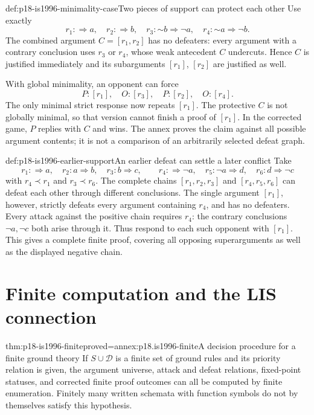 \begin{hbexample}{def:p18-is1996-minimality-case}{Two pieces of support can protect each other}
Use exactly
\[
r_1:\Rightarrow a,\quad r_2:\Rightarrow b,\quad
r_3:\mathord{\sim}b\Rightarrow\neg a,\quad
r_4:\mathord{\sim}a\Rightarrow\neg b.
\]
The combined argument \(C=[r_1,r_2]\) has no defeaters:
every argument with a contrary conclusion uses \(r_3\) or \(r_4\),
whose weak antecedent \(C\) undercuts.
Hence \(C\) is justified immediately and its subarguments
\([r_1]\), \([r_2]\) are justified as well.

With global minimality, an opponent can force
\[
P:[r_1],\quad O:[r_3],\quad P:[r_2],\quad O:[r_4].
\]
The only minimal strict response now repeats \([r_1]\).
The protective \(C\) is not globally minimal, so that version
cannot finish a proof of \([r_1]\).
In the corrected game, \(P\) replies with \(C\) and wins.
The annex proves the claim against all possible argument contents;
it is not a comparison of an arbitrarily selected defeat graph.
\end{hbexample}

\begin{hbexample}{def:p18-is1996-earlier-support}{An earlier defeat can settle a later conflict}
Take
\[
r_1:\Rightarrow a,\quad r_2:a\Rightarrow b,\quad r_3:b\Rightarrow c,
\qquad
r_4:\Rightarrow\neg a,\quad r_5:\neg a\Rightarrow d,\quad
r_6:d\Rightarrow\neg c
\]
with \(r_4\prec r_1\) and \(r_3\prec r_6\).
The complete chains \([r_1,r_2,r_3]\) and \([r_4,r_5,r_6]\)
can defeat each other through different conclusions.
The single argument \([r_1]\), however, strictly defeats every
argument containing \(r_4\), and has no defeaters.
Every attack against the positive chain requires \(r_4\):
the contrary conclusions \(\neg a,\neg c\) both arise through it.
Thus respond to each such opponent with \([r_1]\).
This gives a complete finite proof, covering all opposing
superarguments as well as the displayed negative chain.
\end{hbexample}

\section{Finite computation and the LIS connection}

\begin{hbtheorem}{thm:p18-is1996-finite}{proved=annex:p18.is1996-finite}{A decision procedure for a finite ground theory}
If \(S\cup\mathcal D\) is a finite set of ground rules and
its priority relation is given, the argument universe, attack
and defeat relations, fixed-point statuses, and corrected
finite proof outcomes can all be computed by finite enumeration.
Finitely many written schemata with function symbols do not
by themselves satisfy this hypothesis.
\end{hbtheorem}

